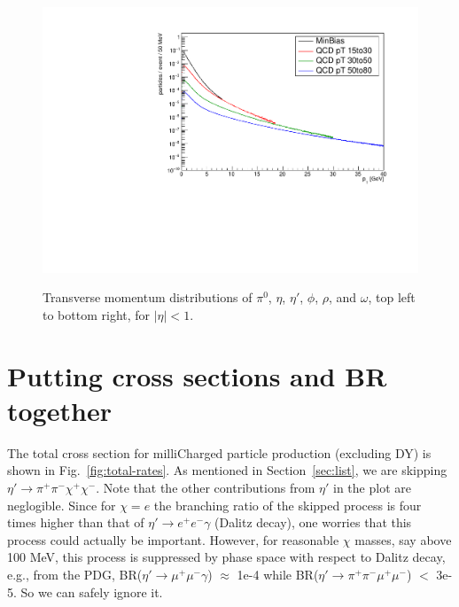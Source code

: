 \documentclass[12pt]{article}
\begin{document}
\begin{figure}
  \includegraphics[width=0.48\linewidth]{plots/h_omega.pdf} \\
  \caption{\protect Transverse momentum distributions of 
$\pi^0$, $\eta$, $\eta'$, $\phi$, $\rho$, and $\omega$, top left
to bottom right, for $|\eta| < 1$.}
\label{fig:mesons}
\end{figure}

\clearpage


\section{Putting cross sections and BR together}
\label{sec:bottom-line}

The total cross section for milliCharged particle production (excluding
DY) is shown in Fig.~\ref{fig:total-rates}.  
As mentioned in
Section~\ref{sec:list}, we are skipping $\eta' \to \pi^+ \pi^- \chi^+
\chi^-$.
Note that the other contributions from $\eta'$ in the plot are neglogible.
Since for $\chi = e$ the branching ratio of the skipped process is four
times higher than
that of $\eta' \to e^+ e^- \gamma$ (Dalitz decay), one worries that
this
process could actually be important.  However, for reasonable $\chi$
masses, say above 100 MeV, this process is suppressed by phase space
with respect to Dalitz decay, e.g., from the PDG,
BR($\eta' \to \mu^+ \mu^- \gamma$) $\approx$ 1e-4 while
BR($\eta' \to \pi^+ \pi^- \mu^+ \mu^-$) $<$ 3e-5.  So we can safely ignore it.
\end{document}
